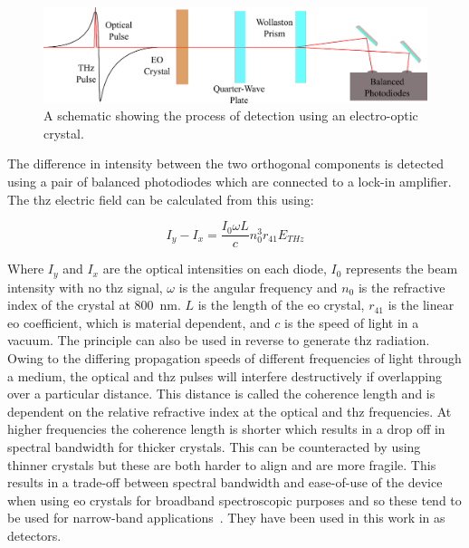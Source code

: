 \begin{figure}[b]
    \centering
    \includegraphics[scale=0.9]{Figures/Misc/Theory/EODetection.png}
    \captionsetup{font = footnotesize, justification = centering}
    \caption[A Schematic showing the Process of Detection using an Electro-Optic Crystal]{A schematic showing the process of detection using an electro-optic crystal.}
    \label{fig:EO_Detection}
\end{figure}

The difference in intensity between the two orthogonal components is detected using a pair of balanced photodiodes which are connected to a lock\nobreakdash-in amplifier. The \acrshort{thz} electric field can be calculated from this using:

\begin{equation}
I_y - I_x = \frac{I_0 \omega L}{c} n_0^3 r_{41} E_{THz}
\end{equation}

Where \(I_y\) and \(I_x\) are the optical intensities on each diode, \(I_0\) represents the beam intensity with no \acrshort{thz} signal, \(\omega\) is the angular frequency and \(n_0\) is the refractive index of the crystal at \SI{800}{nm}. \(L\) is the length of the \acrshort{eo} crystal, \(r_{41}\) is the linear \acrshort{eo} coefficient, which is material dependent, and \(c\) is the speed of light in a vacuum. The principle can also be used in reverse to generate \acrshort{thz} radiation. Owing to the differing propagation speeds of different frequencies of light through a medium, the optical and \acrshort{thz} pulses will interfere destructively if overlapping over a particular distance. This distance is called the coherence length and is dependent on the relative refractive index at the optical and \acrshort{thz} frequencies. At higher frequencies the coherence length is shorter which results in a drop off in spectral bandwidth for thicker crystals. This can be counteracted by using thinner crystals but these are both harder to align and are more fragile. This results in a trade\nobreakdash-off between spectral bandwidth and ease\nobreakdash-of\nobreakdash-use of the device when using \acrshort{eo} crystals for broadband spectroscopic purposes and so these tend to be used for narrow-band applications~\cite{Watanabe2018}. They have been used in this work in  as detectors.

